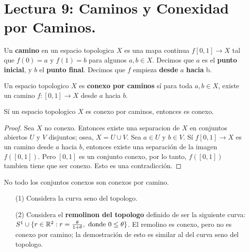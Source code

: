 \section*{Lectura 9: Caminos y Conexidad por Caminos.}

\begin{definition}
    Un \textbf{camino} en un espacio topologica $X$ es una mapa continua
    $f[0,1] \xrightarrow{} X$ tal que $f(0)=a$ y $f(1)=b$ para algunos $a,b \in
    X$. Decimos que  $a$ es el  \textbf{punto inicial}, y $b$ el  \textbf{punto
    final}. Decimos que $f$ empieza  \textbf{desde} $a$  \textbf{hacia} b.
\end{definition}

\begin{definition}
    Un espacio topologico $X$ es  \textbf{conexo por caminos} s\'i para toda
    $a,b \in X$, existe un camino  $f:[0,1] \xrightarrow{} X$ desde $a$ hacia
    $b$.
\end{definition}

\begin{theorem}\label{9.18}
    S\'i un espacio topologico $X$ es conexo por caminos, entonces es conexo.
\end{theorem}
\begin{proof}
    Sea $X$ no conexo. Entonces existe una separacion de  $X$ en conjuntos
    abiertos $U$ y  $V$ disjuntos; osea, $X=U \cup V$. Sea $a \in U$ y $b \in
    V$. S\'i $f [0,1] \xrightarrow{} X$ es un camino desde $a$ hacia $b$,
    entonces existe una separaci\'on de la imagen $f([0,1])$. Pero $[0,1]$ es un
    conjunto conexo, por lo tanto, $f([0,1])$ tambien tiene que ser conexo. Esto
    es una contradicci\'on.
\end{proof}

\begin{example}\label{}
    No todo los conjuntos conexos son conexos por camino.
    \begin{enumerate}
        \item[(1)] Considera la curva seno del topologo.

        \item[(2)] Considera el \textbf{remolinon del topologo} definido de ser
        la siguiente curva: $S^1 \cup \{r \in \mathbb{R}^2 : r=\frac{\theta}{1+\theta},
        \text{ donde }  0 \leq \theta\}$. El remolino es conexo, pero no es
        conexo por camino; la demostraci\'on de esto es similar al del curva
        seno del topologo.
    \end{enumerate}
\end{example}

